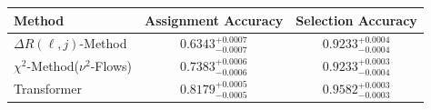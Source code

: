     \begin{tabular}{lcc}
        \toprule
        Method & Assignment Accuracy & Selection Accuracy \\
        \midrule
        $\Delta R(\ell,j)$-Method & $0.6343_{-0.0007}^{+0.0007}$ & $0.9233_{-0.0004}^{+0.0004}$ \\
        $\chi^2$-Method($\nu^2$-Flows) & $0.7383_{-0.0006}^{+0.0006}$ & $0.9233_{-0.0004}^{+0.0003}$ \\
        Transformer & $0.8179_{-0.0005}^{+0.0005}$ & $0.9582_{-0.0003}^{+0.0003}$ \\
        \bottomrule
    \end{tabular}